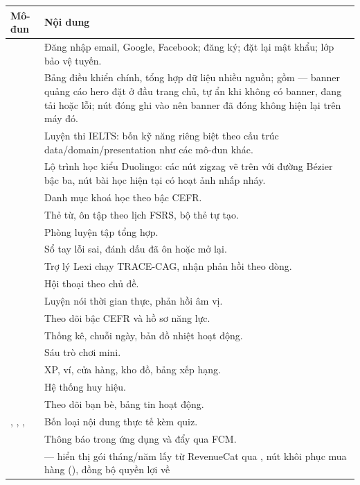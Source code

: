 \begin{longtable}{L{3.2cm} L{10.4cm}}
\toprule
\textbf{Mô-đun} & \textbf{Nội dung}\\
\midrule
\endhead
{} & Đăng nhập email, Google, Facebook; đăng ký; đặt lại mật khẩu; lớp bảo vệ tuyến.\\
 & Bảng điều khiển chính, tổng hợp dữ liệu nhiều nguồn; gồm
 — banner quảng cáo hero đặt ở đầu trang chủ, tự ẩn khi
không có banner, đang tải hoặc lỗi; nút đóng ghi vào  nên banner
đã đóng không hiện lại trên máy đó.\\
 & Luyện thi IELTS: bốn kỹ năng riêng biệt theo cấu trúc data/domain/presentation
như các mô-đun khác.\\
 & Lộ trình học kiểu Duolingo: các nút zigzag vẽ trên  với đường Bézier bậc ba, nút bài học hiện tại có hoạt ảnh nhấp nháy.\\
 & Danh mục khoá học theo bậc CEFR.\\
 & Thẻ từ, ôn tập theo lịch FSRS, bộ thẻ tự tạo.\\
 & Phòng luyện tập tổng hợp.\\
 & Sổ tay lỗi sai, đánh dấu đã ôn hoặc mở lại.\\
 & Trợ lý Lexi chạy TRACE-CAG, nhận phản hồi theo dòng.\\
 & Hội thoại theo chủ đề.\\
 & Luyện nói thời gian thực, phản hồi âm vị.\\
 & Theo dõi bậc CEFR và hồ sơ năng lực.\\
 & Thống kê, chuỗi ngày, bản đồ nhiệt hoạt động.\\
 & Sáu trò chơi mini.\\
 & XP, ví, cửa hàng, kho đồ, bảng xếp hạng.\\
 & Hệ thống huy hiệu.\\
 & Theo dõi bạn bè, bảng tin hoạt động.\\
, , ,  & Bốn loại nội dung thực tế kèm quiz.\\
 & Thông báo trong ứng dụng và đẩy qua FCM.\\
 &  — hiển thị gói tháng/năm lấy từ RevenueCat qua
, nút khôi phục mua hàng (), đồng bộ quyền lợi về

\end{longtable}

